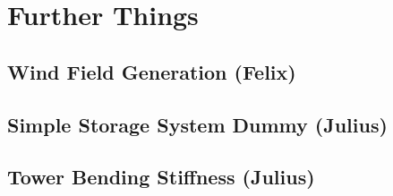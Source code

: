 \chapter{Further Things}
\section{Wind Field Generation (Felix)}


\section{Simple Storage System Dummy (Julius)}


\section{Tower Bending Stiffness (Julius)}



